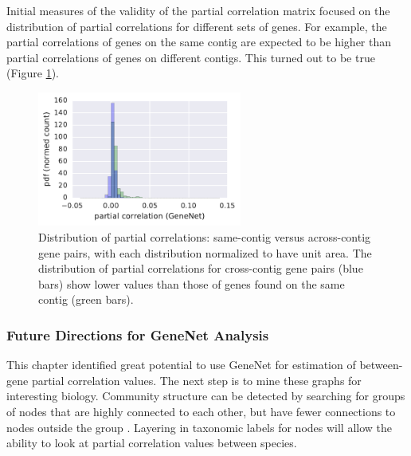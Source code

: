 Initial measures of the validity of the partial correlation matrix focused on the distribution of partial correlations for different sets of genes.
For example, the partial correlations of genes on the same contig are expected to be higher than partial correlations of genes on different contigs.
This turned out to be true (Figure \ref{fig:pcor_same_and_cross_contigs}).

\begin{figure}[H]
\centering
    \includegraphics[width=0.6\textwidth]{./tex/chapter3/figures/170407_same-contig_and_cross-contig_pcor_distributions.pdf}
    \begin{singlespace}
    \caption[Distribution of partial correlations: same-contig versus across-contig gene pairs]{
    	Distribution of partial correlations: same-contig versus across-contig gene pairs, with each distribution normalized to have unit area.
	The distribution of partial correlations for cross-contig gene pairs (blue bars) show lower values than those of genes found on the same contig (green bars).
        }
    \label{fig:pcor_same_and_cross_contigs}
    \end{singlespace}
\end{figure}




\subsubsection{Future Directions for GeneNet Analysis}

This chapter identified great potential to use GeneNet for estimation of between-gene partial correlation values.
The next step is to mine these graphs for interesting biology.
Community structure can be detected by searching for groups of nodes that are highly connected to each other, but have fewer connections to nodes outside the group \cite{girvan2002}.
Layering in taxonomic labels for nodes will allow the ability to look at partial correlation values between species.

